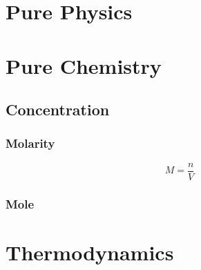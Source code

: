 \documentclass[a4paper]{report}
\begin{document}
\chapter{Pure Physics}

\chapter{Pure Chemistry}

  \begin{multicols}{2}

    \section{Concentration}
        \subsection{Molarity}
        $$M=\frac{n}{V}$$

  \end{multicols}

        \subsection{Mole} 

\chapter{Thermodynamics}
\end{document}

